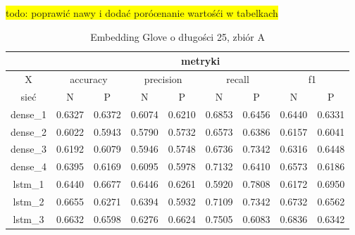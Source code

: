 \colorbox{yellow}{todo: poprawić nawy i dodać poróœnanie wartośći w tabelkach}\\

\begin{table}[p] \label{tab:wyniki_glove_A} \centering
    \caption{Embedding Glove o długości 25, zbiór A}

    \begin{tabular} {|c|c|c|c|c|c|c|c|c| }    \hline
                 & \multicolumn{8}{c|}{metryki}                                                                                                                               \\ \hline
        X        & \multicolumn{2}{c|}{accuracy} & \multicolumn{2}{c|}{precision} & \multicolumn{2}{c|}{recall} & \multicolumn{2}{c|}{f1}                                     \\ \hline
        sieć     & N                             & P                              & N                           & P                       & N      & P      & N      & P      \\ \hline
        dense\_1 & 0.6327                        & 0.6372                         & 0.6074                      & 0.6210                  & 0.6853 & 0.6456 & 0.6440 & 0.6331 \\ \hline
        dense\_2 & 0.6022                        & 0.5943                         & 0.5790                      & 0.5732                  & 0.6573 & 0.6386 & 0.6157 & 0.6041 \\ \hline
        dense\_3 & 0.6192                        & 0.6079                         & 0.5946                      & 0.5748                  & 0.6736 & 0.7342 & 0.6316 & 0.6448 \\ \hline
        dense\_4 & 0.6395                        & 0.6169                         & 0.6095                      & 0.5978                  & 0.7132 & 0.6410 & 0.6573 & 0.6186 \\ \hline
        lstm\_1  & 0.6440                        & 0.6677                         & 0.6446                      & 0.6261                  & 0.5920 & 0.7808 & 0.6172 & 0.6950 \\ \hline
        lstm\_2  & 0.6655                        & 0.6271                         & 0.6394                      & 0.5932                  & 0.7109 & 0.7342 & 0.6732 & 0.6562 \\ \hline
        lstm\_3  & 0.6632                        & 0.6598                         & 0.6276                      & 0.6624                  & 0.7505 & 0.6083 & 0.6836 & 0.6342 \\ \hline

\end{tabular}
\end{table}
